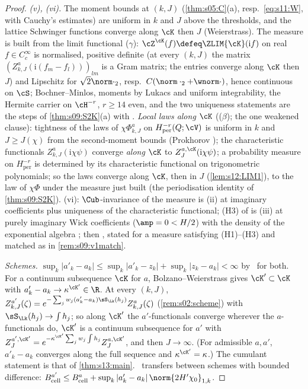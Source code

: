 \begin{proof}
\emph{(v), (vi).} The moment bounds at $(k,J)$ (\cref{thm:s05:C}(a), resp.\ \eqref{eq:s11:W}, with Cauchy's estimates) are uniform in $k$ and $J$ above the thresholds, and the lattice Schwinger functions converge along $\cK$ then $J$ (Weierstrass). The measure is built from the limit functional ($\gamma$): $\cZ^{\cK}(f)\defeq\ZLIM{\cK}(\mathrm if)$ on real $f\in C^\infty_c$ is normalised, positive definite (at every $(k,J)$ the matrix $(Z^a_{k,J}(\mathrm i(f_m-f_l)))_{lm}$ is a Gram matrix; the entries converge along $\cK$ then $J$) and Lipschitz for $\sqrt2\norm\cdot_2$, resp.\ $C(\norm\cdot_2+\wnorm\cdot)$, hence continuous on $\cS$; Bochner--Minlos, moments by Lukacs \cite{Luk70} and uniform integrability, the Hermite carrier on $\cH^{-r}$, $r\ge14$ even, and the two uniqueness statements are the steps of \cref{thm:s09:S2K}(a) with \cite[lem:D:hermite(c), lem:D:realize, prop:discharge]{SymPhase}. \emph{Local laws along $\cK$} (($\beta$); the one weakened clause): tightness of the laws of $\chi\Phi^a_{k,J}$ on $H^{-r}_{\mathrm{per}}(Q;\cV)$ is uniform in $k$ and $J\ge J(\chi)$ from the second-moment bounds (Prokhorov \cite{Bil99}); the characteristic functionals $Z^a_{k,J}(\mathrm i\chi\psi)$ converge \emph{along $\cK$} to $Z^{a,\cK}_J(\mathrm i\chi\psi)$; a probability measure on $H^{-r}_{\mathrm{per}}$ is determined by its characteristic functional on trigonometric polynomials; so the laws converge along $\cK$, then in $J$ (\cref{lem:s12:LIM1}), to the law of $\chi\Phi$ under the measure just built (the periodisation identity of \cref{thm:s09:S2K}). (vi): $\Cub$-invariance of the measure is (ii) at imaginary coefficients plus uniqueness of the characteristic functional; (H3) of \cite{SymPhase} is (iii) at purely imaginary Wick coefficients ($\amp=0<H/2$) with the density of the exponential algebra \cite[lem:A:mc]{SymPhase}; then \cite[thm:D:decomp, thm:D:mean, thm:D:diag, prop:D:recon, cor:D:schwinger(iv), add:Ohdecomp, add:OS4(iii)]{SymPhase}, stated for a measure satisfying (H1)--(H3) and matched as in \cref{rem:s09:v1match}.

\emph{Schemes.} $\sup_k|a'_k-a_k|\le\sup_k|a'_k-z_k|+\sup_k|z_k-a_k|<\infty$ by \SCH\ for both. For a continuum subsequence $\cK$ for $a$, Bolzano--Weierstrass gives $\cK'\subset\cK$ with $a'_k-a_k\to\kappa^{\cK'}\in\R$. At every $(k,J)$, $Z^{a'}_{k,J}(\zeta)=e^{-\sum_jw_j(a'_k-a_k)\sS_{\Lk}(h_j)}Z^a_{k,J}(\zeta)$ (\cref{rem:s02:scheme}) with $\sS_{\Lk}(h_j)\to\int h_j$; so along $\cK'$ the $a'$-functionals converge wherever the $a$-functionals do, $\cK'$ is a continuum subsequence for $a'$ with $Z^{a',\cK'}_J=e^{-\kappa^{\cK'}\sum_jw_j\int h_j}Z^{a,\cK'}_J$, and then $J\to\infty$. (For admissible $a,a'$, $a'_k-a_k$ converges along the full sequence and $\kappa^{\cK'}=\kappa$.) The cumulant statement is that of \cref{thm:s13:main}. \Bcell\ transfers between schemes with bounded difference: $B^{a'}_{\mathrm{cell}}\le B^a_{\mathrm{cell}}+\sup_k|a'_k-a_k|\,\norm{2H'\chi_0}_{1,k}$.


\end{proof}
